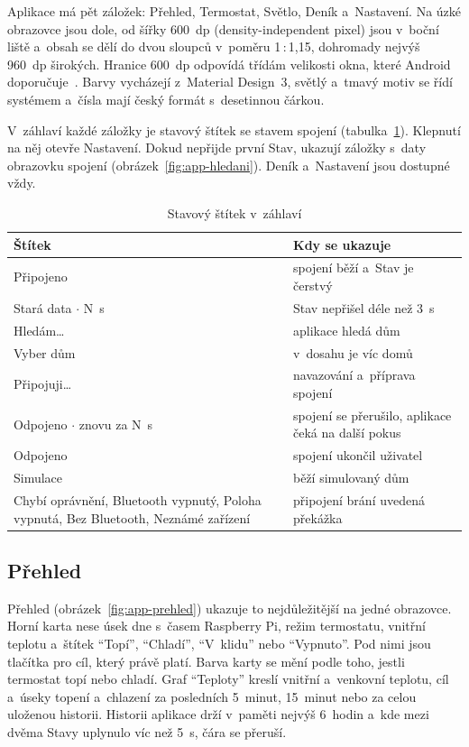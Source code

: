 Aplikace má pět záložek: Přehled, Termostat, Světlo, Deník a~Nastavení. Na úzké obrazovce jsou
dole, od šířky 600~dp (density-independent pixel) jsou v~boční liště a~obsah se dělí do dvou
sloupců v~poměru 1\,:\,1,15, dohromady nejvýš 960~dp širokých. Hranice 600~dp odpovídá třídám velikosti
okna, které Android doporučuje~\cite{app-velikost-okna}. Barvy vycházejí z~Material Design~3,
světlý a~tmavý motiv se řídí systémem a~čísla mají český formát s~desetinnou čárkou.

V~záhlaví každé záložky je stavový štítek se stavem spojení (tabulka~\ref{tab:app-stitky}).
Klepnutí na něj otevře Nastavení. Dokud nepřijde první Stav, ukazují záložky s~daty obrazovku
spojení (obrázek~\ref{fig:app-hledani}). Deník a~Nastavení jsou dostupné vždy.

\begin{table}[H]
\centering
\caption{Stavový štítek v~záhlaví}
\label{tab:app-stitky}
\begin{tabular}{|p{}|p{}|}
\hline
\textbf{Štítek} & \textbf{Kdy se ukazuje} \\ \hline
Připojeno & spojení běží a~Stav je čerstvý \\ \hline
Stará data $\cdot$ N~s & Stav nepřišel déle než 3~s \\ \hline
Hledám\dots & aplikace hledá dům \\ \hline
Vyber dům & v~dosahu je víc domů \\ \hline
Připojuji\dots & navazování a~příprava spojení \\ \hline
Odpojeno $\cdot$ znovu za N~s & spojení se přerušilo, aplikace čeká na další pokus \\ \hline
Odpojeno & spojení ukončil uživatel \\ \hline
Simulace & běží simulovaný dům \\ \hline
Chybí oprávnění, Bluetooth vypnutý, Poloha vypnutá, Bez Bluetooth, Neznámé zařízení &
  připojení brání uvedená překážka \\ \hline
\end{tabular}
\end{table}

\subsection{Přehled}

Přehled (obrázek~\ref{fig:app-prehled}) ukazuje to nejdůležitější na jedné obrazovce. Horní
karta nese úsek dne s~časem Raspberry Pi, režim termostatu, vnitřní teplotu a~štítek
\enquote{Topí}, \enquote{Chladí}, \enquote{V~klidu} nebo \enquote{Vypnuto}. Pod nimi jsou
tlačítka pro cíl, který právě platí. Barva karty se mění podle toho, jestli termostat topí nebo
chladí. Graf \enquote{Teploty} kreslí vnitřní a~venkovní teplotu, cíl a~úseky topení
a~chlazení za posledních 5~minut, 15~minut nebo za celou uloženou historii. Historii aplikace
drží v~paměti nejvýš 6~hodin a~kde mezi dvěma Stavy uplynulo víc než 5~s, čára se přeruší.

